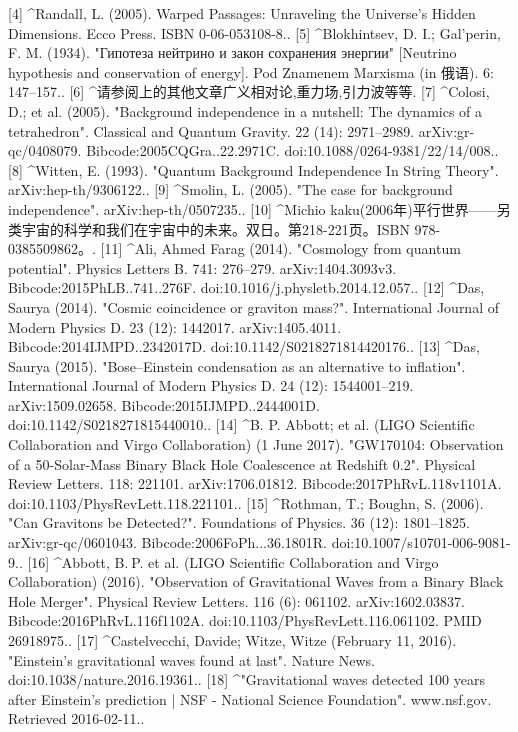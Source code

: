 [4]
^Randall, L. (2005). Warped Passages: Unraveling the Universe's Hidden Dimensions. Ecco Press. ISBN 0-06-053108-8..
[5]
^Blokhintsev, D. I.; Gal'perin, F. M. (1934). "Гипотеза нейтрино и закон сохранения энергии" [Neutrino hypothesis and conservation of energy]. Pod Znamenem Marxisma (in 俄语). 6: 147–157..
[6]
^请参阅上的其他文章广义相对论,重力场,引力波等等.
[7]
^Colosi, D.; et al. (2005). "Background independence in a nutshell: The dynamics of a tetrahedron". Classical and Quantum Gravity. 22 (14): 2971–2989. arXiv:gr-qc/0408079. Bibcode:2005CQGra..22.2971C. doi:10.1088/0264-9381/22/14/008..
[8]
^Witten, E. (1993). "Quantum Background Independence In String Theory". arXiv:hep-th/9306122..
[9]
^Smolin, L. (2005). "The case for background independence". arXiv:hep-th/0507235..
[10]
^Michio kaku(2006年)平行世界——另类宇宙的科学和我们在宇宙中的未来。双日。第218-221页。ISBN 978-0385509862。.
[11]
^Ali, Ahmed Farag (2014). "Cosmology from quantum potential". Physics Letters B. 741: 276–279. arXiv:1404.3093v3. Bibcode:2015PhLB..741..276F. doi:10.1016/j.physletb.2014.12.057..
[12]
^Das, Saurya (2014). "Cosmic coincidence or graviton mass?". International Journal of Modern Physics D. 23 (12): 1442017. arXiv:1405.4011. Bibcode:2014IJMPD..2342017D. doi:10.1142/S0218271814420176..
[13]
^Das, Saurya (2015). "Bose–Einstein condensation as an alternative to inflation". International Journal of Modern Physics D. 24 (12): 1544001–219. arXiv:1509.02658. Bibcode:2015IJMPD..2444001D. doi:10.1142/S0218271815440010..
[14]
^B. P. Abbott; et al. (LIGO Scientific Collaboration and Virgo Collaboration) (1 June 2017). "GW170104: Observation of a 50-Solar-Mass Binary Black Hole Coalescence at Redshift 0.2". Physical Review Letters. 118: 221101. arXiv:1706.01812. Bibcode:2017PhRvL.118v1101A. doi:10.1103/PhysRevLett.118.221101..
[15]
^Rothman, T.; Boughn, S. (2006). "Can Gravitons be Detected?". Foundations of Physics. 36 (12): 1801–1825. arXiv:gr-qc/0601043. Bibcode:2006FoPh...36.1801R. doi:10.1007/s10701-006-9081-9..
[16]
^Abbott, B. P. et al. (LIGO Scientific Collaboration and Virgo Collaboration) (2016). "Observation of Gravitational Waves from a Binary Black Hole Merger". Physical Review Letters. 116 (6): 061102. arXiv:1602.03837. Bibcode:2016PhRvL.116f1102A. doi:10.1103/PhysRevLett.116.061102. PMID 26918975..
[17]
^Castelvecchi, Davide; Witze, Witze (February 11, 2016). "Einstein's gravitational waves found at last". Nature News. doi:10.1038/nature.2016.19361..
[18]
^"Gravitational waves detected 100 years after Einstein's prediction | NSF - National Science Foundation". www.nsf.gov. Retrieved 2016-02-11..
